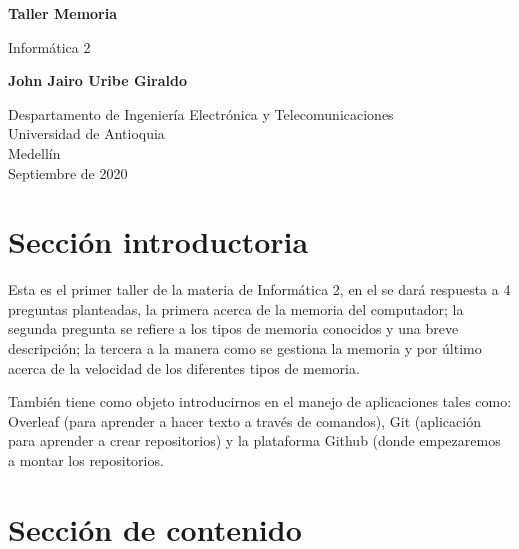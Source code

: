 \documentclass{article}
\begin{document}
\begin{titlepage}
    \begin{center}
        \vspace*{1cm}
            
        \Huge
        \textbf{Taller Memoria}
            
        \vspace{0.5cm}
        \LARGE
        Informática 2
            
        \vspace{1.5cm}
            
        \textbf{John Jairo Uribe Giraldo}
        
            
        \vfill
            
        \vspace{0.8cm}
            
        \Large
        Despartamento de Ingeniería Electrónica y Telecomunicaciones\\
        Universidad de Antioquia\\
        Medellín\\
        Septiembre de 2020
            
    \end{center}
\end{titlepage}

\tableofcontents
\newpage

\section{Sección introductoria}
Esta es el primer taller de la materia de Informática 2, en el se dará respuesta a 4 preguntas planteadas, la primera acerca de la memoria del computador; la segunda pregunta se refiere a los tipos de memoria conocidos y una breve descripción; la tercera a la manera como se gestiona la memoria y por último acerca de la velocidad de los diferentes tipos de memoria.

También tiene como objeto introducirnos en el manejo de aplicaciones tales como: Overleaf (para aprender a hacer texto a través de comandos), Git (aplicación para aprender a crear repositorios) y la plataforma Github (donde empezaremos a montar los repositorios.
\newpage
\section{Sección de contenido} \label{contenido}
\end{document}
